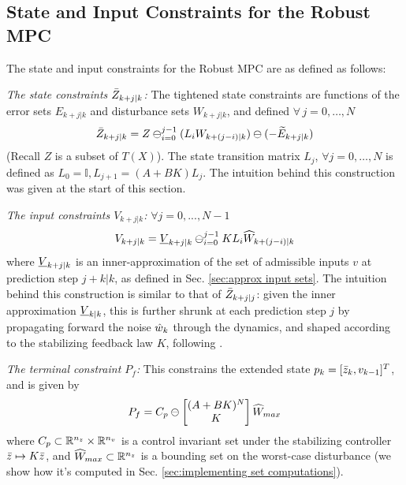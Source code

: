\subsection{State and Input Constraints for the Robust MPC}
\label{sec:Constraints}
The state and input constraints for the Robust MPC are as defined as follows:

\textit{The state constraints $\bar{Z}_{k+j|k}$:}
The tightened state constraints are functions of the error sets $E_{k+j|k}$ and disturbance sets $W_{k+j|k}$, and defined $\forall\,j=0,\dotsc,N$
{\small{
\begin{equation} 
\label{eq:Set_constraints}
\bar{Z}_{k+j|k} = Z \ominus_{i=0}^{j-1}(L_iW_{k+(j-i)|k})\ominus (-\widetilde{E}_{k+j|k})
\end{equation}
}}
(Recall $Z$ is a subset of $T(X)$).
The state transition matrix $L_j$, $\forall j=0,\dotsc,N$   is defined as $L_0 = \mathbb{I}, L_{j+1} = (A+BK)L_j $.
The intuition behind this construction was given at the start of this section.

\textit{The input constraints $V_{k+j|k}$:}
$\forall j=0,...,N-1$
\begin{equation} 
\label{eq:input_constraints}
V_{k+j|k} = \underline{V}_{k+j|k} \ominus_{i=0}^{j-1}KL_i\widehat{W}_{k+(j-i)|k} 
\end{equation}
where $\underline{V}_{k+j|k} $ is an inner-approximation of the set of admissible inputs $v$ at prediction step $j+k|k$, as defined in Sec. \ref{sec:approx input sets}.
The intuition behind this construction is similar to that of $\bar{Z}_{k+j|j}$: given the inner approximation $\underline{V}_{k|k} $, this is further shrunk at each prediction step $j$ by propagating forward the noise $\hat{w}_k$ through the dynamics, and shaped according to the stabilizing feedback law $K$, following \cite{RichardsH05_RMPC}.

\textit{The terminal constraint $P_f$:}
This constrains the extended state $p_k = [\bar{z}_{k}, v_{k-1}]^T$, and is given by 
\begin{equation}
\label{eq:P_f_def}
P_f = C_p\ominus \left\lbrack \begin{matrix} (A+BK)^N \\ K\end{matrix} \right \rbrack \widehat{W}_{max}
\end{equation}
where $C_p \subset \mathbb{R}^{n_z}\times \mathbb{R}^{n_v}$ is a control invariant set under the stabilizing controller $\bar{z} \mapsto K\bar{z}$, 
and $\widehat{W}_{max} \subset \mathbb{R}^{n_z}$ is a bounding set on the worst-case disturbance (we show how it's computed in Sec. \ref{sec:implementing set computations}).

